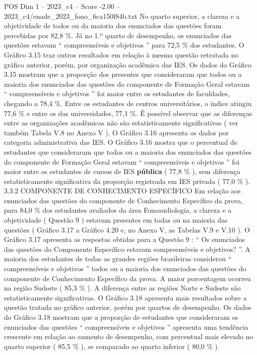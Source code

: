 \begin{textsample}{POS Dim 1 – 2023\_c4 – Score -2.00 – 2023\_c4/enade\_2023\_fono\_6ca150f84b.txt}
No quarto superior, a clareza e a objetividade de todos ou da maioria dos enunciados das questões foram percebidas por 82,8 \%.
Já no 1.º quarto de desempenho, os enunciados das questões estavam “ compreensíveis e objetivos ” para 72,5 \% dos estudantes.
O Gráfico 3.15 traz outros resultados em relação à mesma questão retratada no gráfico anterior, porém, por organização acadêmica das IES.
Os dados do Gráfico 3.15 mostram que a proporção dos presentes que consideraram que todos ou a maioria dos enunciados das questões do componente de Formação Geral estavam “ compreensíveis e objetivos ” foi maior entre os estudantes de faculdades, chegando a 78,4 \%.
Entre os estudantes de centros universitários, o índice atingiu 77,6 \% e entre os das universidades, 77,1 \%.
É possível observar que as diferenças entre as organizações acadêmicas não são estatisticamente significativas ( ver também Tabela V.8 no Anexo V ).
O Gráfico 3.16 apresenta os dados por categoria administrativa das IES.
O Gráfico 3.16 mostra que o percentual de estudantes que consideraram que todos ou a maioria dos enunciados das questões do componente de Formação Geral estavam “ compreensíveis e objetivos ” foi maior entre os estudantes de cursos de IES \textbf{pública} ( 77,8 \% ), sem diferença estatisticamente significativa da proporção registrada em IES privada ( 77,0 \% ). 3.3.2 COMPONENTE DE CONHECIMENTO ESPECÍFICO Em relação aos enunciados das questões do componente de Conhecimento Específico da prova, para 84,0 \% dos estudantes avaliados da área Fonoaudiologia, a clareza e a objetividade ( Questão 9 ) estavam presentes em todas ou na maioria das questões ( Gráfico 3.17 a Gráfico 4.20 e, no Anexo V, as Tabelas V.9 e V.10 ).
O Gráfico 3.17 apresenta as respostas obtidas para a Questão 9 : “ Os enunciados das questões do Componente Específico estavam compreensíveis e objetivos? ”.
A maioria dos estudantes de todas as grandes regiões brasileiras considerou “ compreensíveis e objetivos ” todos ou a maioria dos enunciados das questões do componente de Conhecimento Específico da prova.
A maior porcentagem ocorreu na região Sudeste ( 85,3 \% ).
A diferença entre as regiões Norte e Sudeste são estatisticamente significativas.
O Gráfico 3.18 apresenta mais resultados sobre a questão tratada no gráfico anterior, porém por quartos de desempenho.
Os dados do Gráfico 3.18 mostram que a proporção de estudantes que consideraram os enunciados das questões “ compreensíveis e objetivos ” apresenta uma tendência crescente em relação ao aumento de desempenho, com percentual mais elevado no quarto superior ( 85,5 \% ), se comparado ao quarto inferior ( 80,0 \% ).

\end{textsample}
